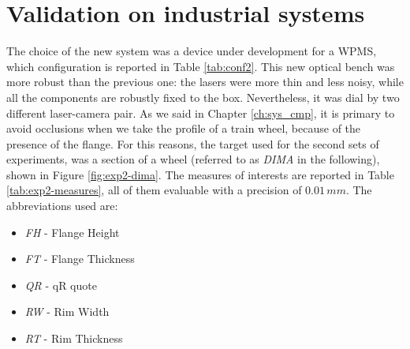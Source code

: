 \section{Validation on industrial systems}
\label{sec:exp2}
The choice of the new system was a device under development for a \acs{WPMS}, which configuration is reported in Table \ref{tab:conf2}. This new optical bench was more robust than the previous one: the lasers were more thin and less noisy, while all the components are robustly fixed to the box. Nevertheless, it was dial by two different laser-camera pair. As we said in Chapter \ref{ch:sys_cmp}, it is primary to avoid occlusions when we take the profile of a train wheel, because of the presence of the flange. For this reasons, the target used for the second sets of experiments, was a section of a wheel (referred to as \textit{DIMA} in the following), shown in Figure \ref{fig:exp2-dima}. The measures of interests are reported in Table \ref{tab:exp2-measures}, all of them evaluable with a precision of $0.01 \, mm$. The abbreviations used are:
  \begin{itemize}
    \item \textit{FH} - Flange Height
    \item \textit{FT} - Flange Thickness
    \item \textit{QR} - qR quote 
    \item \textit{RW} - Rim Width
    \item \textit{RT} - Rim Thickness
  \end{itemize}




